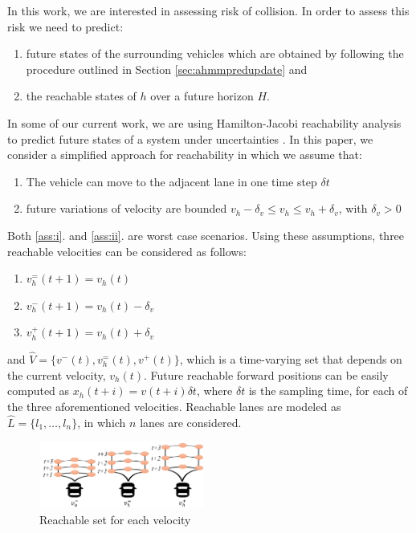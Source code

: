 \documentclass[letterpaper, 10 pt, conference]{ieeeconf}  %
\newcommand\NB[1]{$\spadesuit$\footnote{NB: #1}}
\begin{document}
In this work, we are interested in assessing risk of collision. In order to assess this risk we need to predict:
\begin{enumerate}
\item future states of the surrounding vehicles which are obtained by following the procedure outlined in Section \ref{sec:ahmmpredupdate} and
\item the reachable states of $h$ over a future horizon $H$.
\end{enumerate}
In some of our current work, we are using Hamilton-Jacobi reachability analysis to predict future states of a system under uncertainties \cite{esen}. In this paper, we consider a simplified approach for reachability in which we assume that:
\begin{enumerate}
\item The vehicle can move to the adjacent lane in one time step $\delta t$ \label{ass:i}
\item future variations of velocity are bounded $v_h-\delta_v \leq v_h\leq v_h+\delta_v$, with $\delta_v>0$ \label{ass:ii}
\end{enumerate}
Both \ref{ass:i}. and \ref{ass:ii}. are worst case scenarios. %
Using these assumptions, three reachable velocities can be considered as follows:
\begin{enumerate} %
    \item $v_h^=(t+1)=v_h(t)$
    \item $v_h^-(t+1)=v_h(t)-\delta_v$
    \item $v_h^+(t+1)=v_h(t)+\delta_v$
\end{enumerate} 
and $\hat{V} = \{v^-(t),v_h^=(t),v^+(t)\}$, which is a time-varying set that depends on the current velocity, $v_h(t)$. Future reachable forward positions can be easily computed as $x_h(t+i)=v(t+i)\delta t$, where $\delta t$ is the sampling time, for each of the three aforementioned velocities. Reachable lanes are modeled as $\hat{L} = \{l_1,\ldots,l_n\}$, in which $n$ lanes are considered. 

\begin{figure}[ht!]
    \includegraphics[width=0.48\textwidth]{fig/reach.png}
    \caption{Reachable set for each velocity}
    \label{fig:reach}
\end{figure}
\end{document}
